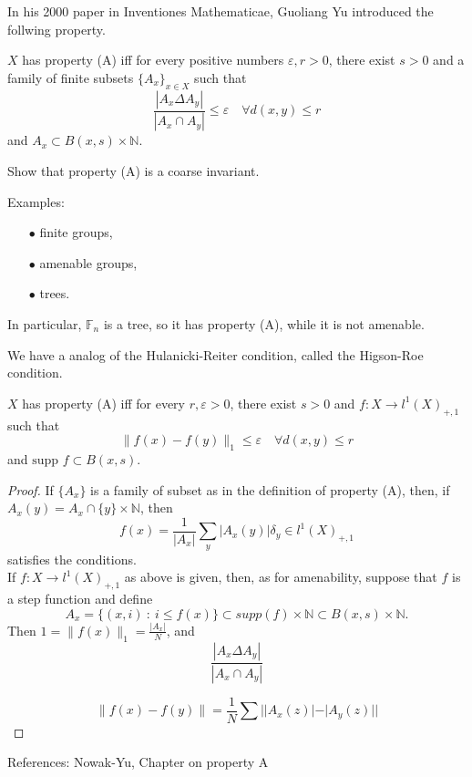 In his 2000 paper in Inventiones Mathematicae, Guoliang Yu introduced the follwing property.

\begin{definition}
$X$ has property (A) iff for every positive numbers $\varepsilon, r >0$, there exist $s>0$ and a family of finite subsets $\{A_x\}_{x\in X}$ such that 
\[\frac{|A_x \Delta A_y|}{|A_x\cap A_y|} \leq \varepsilon \quad \forall d(x,y)\leq r\]
and $A_x\subset B(x,s)\times \mathbb N$.
\end{definition}

Show that property (A) is a coarse invariant.

Examples:
\begin{itemize}
\item[$\bullet$] finite groups,
\item[$\bullet$] amenable groups,
\item[$\bullet$] trees.
\end{itemize}

In particular, $\mathbb F_n$ is a tree, so it has property (A), while it is not amenable.

We have a analog of the Hulanicki-Reiter condition, called the Higson-Roe condition.

\begin{thm} 
$X$ has property (A) iff for every $r,\varepsilon>0$, there exist $s>0$ and $f:X\rightarrow l^1(X)_{+,1}$ such that 
\[\|f(x)-f(y)\|_1 \leq \varepsilon \quad \forall d(x,y)\leq r\]
and $\text{supp }f\subset B(x,s)$.
\end{thm}

\begin{proof}
If $\{A_x\}$ is a family of subset as in the definition of property (A), then, if $A_x(y) = A_x \cap \{y\}\times \mathbb N$, then 
\[f(x) = \frac{1}{|A_x|}\sum_y |A_x(y)|\delta_y \in l^1(X)_{+,1}\]
satisfies the conditions.\\

If $f: X\rightarrow l^1(X)_{+,1}$ as above is given, then, as for amenability, suppose that $f$ is a step function and define 
\[A_x = \{(x,i)\ : \ i\leq f(x)\}\subset supp(f)\times \mathbb N \subset B(x,s)\times \mathbb N.\]
Then $1 = \|f(x)\|_1= \frac{|A_x|}{N}$, and 
\[\frac{|A_x\Delta A_y|}{|A_x\cap A_y|}\]  

\[ \|f(x)-f(y)\|= \frac{1}{N}\sum ||A_x(z)|-|A_y(z)||  \]  
\end{proof}

References: Nowak-Yu, Chapter on property A

